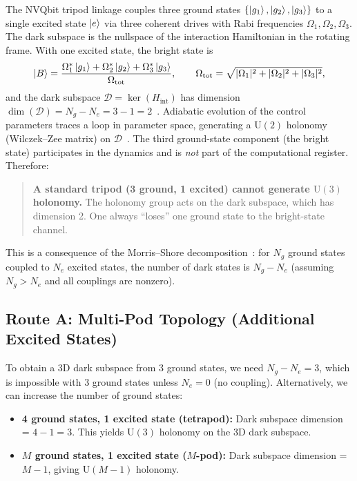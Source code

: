 \documentclass[11pt,letterpaper]{article}
\newcommand{\UU}{\mathrm{U}}
\begin{document}
The NVQbit tripod linkage couples three ground states $\{\ket{g_1}, \ket{g_2}, \ket{g_3}\}$
to a single excited state $\ket{e}$ via three coherent drives with Rabi frequencies
$\Omega_1, \Omega_2, \Omega_3$. The dark subspace is the nullspace of the interaction
Hamiltonian in the rotating frame. With one excited state, the bright state is
\begin{equation}
  \ket{B} = \frac{\Omega_1^* \ket{g_1} + \Omega_2^* \ket{g_2} + \Omega_3^* \ket{g_3}}{\Omega_{\text{tot}}},
  \qquad \Omega_{\text{tot}} = \sqrt{|\Omega_1|^2 + |\Omega_2|^2 + |\Omega_3|^2},
  \label{eq:bright}
\end{equation}
and the dark subspace $\mathcal{D} = \ker(H_{\text{int}})$ has dimension
$\dim(\mathcal{D}) = N_g - N_e = 3 - 1 = 2$~\cite{Unanyan2004}. %
Adiabatic evolution
of the control parameters traces a loop in parameter space, generating a $\UU(2)$ holonomy
(Wilczek--Zee matrix) on $\mathcal{D}$~\cite{WilczekZee1984}. The third ground-state
component (the bright state) participates in the dynamics and is \emph{not} part of the
computational register. Therefore:

\begin{quote}
\textbf{A standard tripod (3 ground, 1 excited) cannot generate $\UU(3)$ holonomy.}
The holonomy group acts on the dark subspace, which has dimension 2. One always ``loses''
one ground state to the bright-state channel.
\end{quote}

This is a consequence of the Morris--Shore decomposition~\cite{Vitanov2017}: for $N_g$
ground states coupled to $N_e$ excited states, the number of dark states is $N_g - N_e$
(assuming $N_g > N_e$ and all couplings are nonzero).

\subsection{Route A: Multi-Pod Topology (Additional Excited States)}
\label{sec:multipod}

To obtain a 3D dark subspace from 3 ground states, we need $N_g - N_e = 3$, which is
impossible with 3 ground states unless $N_e = 0$ (no coupling). Alternatively, we can
increase the number of ground states:
\begin{itemize}
  \item \textbf{4 ground states, 1 excited state (tetrapod):} Dark subspace dimension =
    $4 - 1 = 3$. This yields $\UU(3)$ holonomy on the 3D dark subspace.
  \item \textbf{$M$ ground states, 1 excited state ($M$-pod):} Dark subspace dimension =
    $M - 1$, giving $\UU(M-1)$ holonomy.
\end{itemize}
\end{document}
